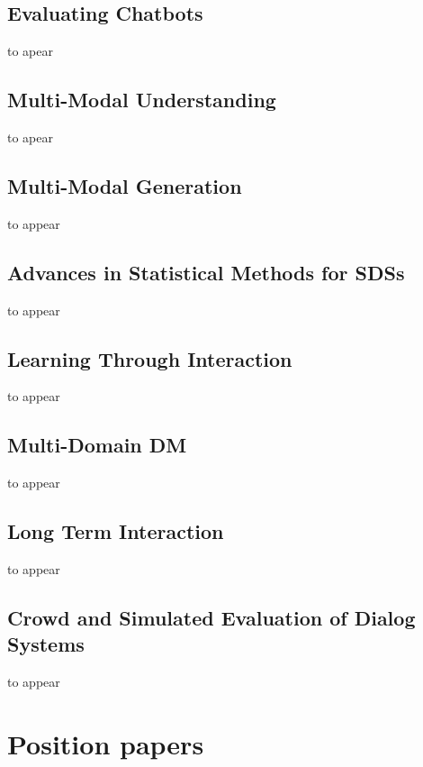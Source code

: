 \documentclass[12pt]{article}
\begin{document}
\subsection{Evaluating Chatbots}
to apear
\subsection{Multi-Modal Understanding}
to apear
\subsection{Multi-Modal Generation}
to appear
\subsection{Advances in Statistical Methods for SDSs}
to appear
\subsection{Learning Through Interaction}
to appear
\subsection{Multi-Domain DM}
to appear
\subsection{Long Term Interaction}
to appear
\subsection{Crowd and Simulated Evaluation of Dialog Systems}
to appear
 

\section{Position papers}
\end{document}
